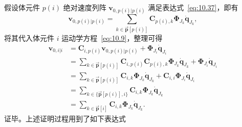 假设体元件 $p(i)$ 绝对速度列阵 $\boldsymbol{v}_{0,p(i)|p(i)}$ 满足表达式~\eqref{eq:10.37}，即有
\begin{equation}\label{eq:11.56}
\boldsymbol{v}_{0,p(i)|p(i)} = \sum_{k \in \vec{\boldsymbol{p}}[p(i)]} \boldsymbol{C}_{p(i),k} \boldsymbol{\Phi}_{J_k} \dot{\boldsymbol{q}}_{J_k},
\end{equation}
将其代入体元件 $i$ 运动学方程~\eqref{eq:10.9}，整理可得
\begin{equation}\label{eq:11.57}
\begin{aligned}
\boldsymbol{v}_{0,i|i} &= \boldsymbol{C}_{i,p(i)} \boldsymbol{v}_{0,p(i)|p(i)} + \boldsymbol{\Phi}_{J_i} \dot{\boldsymbol{q}}_{J_i} \\
&= \sum_{k \in \vec{\boldsymbol{p}}[p(i)]} \boldsymbol{C}_{i,p(i)} \boldsymbol{C}_{p(i),k} \boldsymbol{\Phi}_{J_k} \dot{\boldsymbol{q}}_{J_k} + \boldsymbol{\Phi}_{J_i} \dot{\boldsymbol{q}}_{J_i} \\
&= \sum_{k \in \vec{\boldsymbol{p}}[p(i)]} \boldsymbol{C}_{i,k} \boldsymbol{\Phi}_{J_k} \dot{\boldsymbol{q}}_{J_k} + \boldsymbol{C}_{i,i} \boldsymbol{\Phi}_{J_i} \dot{\boldsymbol{q}}_{J_i} \\
&= \sum_{k \in \{ \vec{\boldsymbol{p}}[p(i)], i \}} \boldsymbol{C}_{i,k} \boldsymbol{\Phi}_{J_k} \dot{\boldsymbol{q}}_{J_k} \\
&= \sum_{k \in \vec{\boldsymbol{p}}[i]} \boldsymbol{C}_{i,k} \boldsymbol{\Phi}_{J_k} \dot{\boldsymbol{q}}_{J_k}.
\end{aligned}
\end{equation}
证毕。上述证明过程用到了如下表达式
